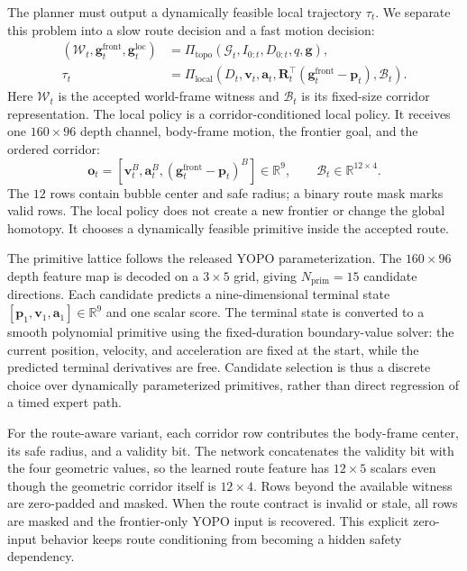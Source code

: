 \documentclass[letterpaper,10pt,conference]{ieeeconf}
\newcommand{\vect}[1]{\boldsymbol{#1}}
\newcommand{\R}{\mathbb{R}}
\begin{document}
The planner must output a dynamically feasible local trajectory $\tau_t$.
We separate this problem into a slow route decision and a fast motion
decision:
\begin{align}
  (\mathcal{W}_t,\vect{g}^{\mathrm{front}}_t,
   \vect{g}^{\mathrm{loc}}_t)
    &= \Pi_{\mathrm{topo}}(\mathcal{G}_t,I_{0:t},D_{0:t},q,\vect{g}), \\
  \tau_t
    &= \Pi_{\mathrm{local}}(D_t,\vect{v}_t,\vect{a}_t,
       \vect{R}_t^\top(\vect{g}^{\mathrm{front}}_t-\vect{p}_t),
       \mathcal{B}_t).
\end{align}
Here $\mathcal{W}_t$ is the accepted world-frame witness and
$\mathcal{B}_t$ is its fixed-size corridor representation.  The local policy
is a corridor-conditioned local policy.  It receives one $160\times96$ depth channel,
body-frame motion, the frontier goal, and the ordered corridor:
\begin{equation}
 \vect{o}_t = [\vect{v}^{B}_t,\vect{a}^{B}_t,
                (\vect{g}^{\mathrm{front}}_t-\vect{p}_t)^{B}] \in \R^9,
 \qquad
 \mathcal{B}_t\in\R^{12\times4}.
\end{equation}
The $12$ rows contain bubble center and safe radius; a binary route mask marks
valid rows.  The local policy does not create a new frontier or change the global
homotopy.  It chooses a dynamically feasible primitive inside the accepted
route.

The primitive lattice follows the released YOPO parameterization.  The
$160\times96$ depth feature map is decoded on a $3\times5$ grid, giving
$N_{\mathrm{prim}}=15$ candidate directions.  Each candidate predicts a
nine-dimensional terminal state $[\vect{p}_1,\vect{v}_1,\vect{a}_1]\in\R^9$
and one scalar score.  The terminal state is converted to a smooth
polynomial primitive using the fixed-duration boundary-value solver: the
current position, velocity, and acceleration are fixed at the start, while
the predicted terminal derivatives are free.  Candidate selection is thus a
discrete choice over dynamically parameterized primitives, rather than direct
regression of a timed expert path.

For the route-aware variant, each corridor row contributes the body-frame
center, its safe radius, and a validity bit.  The network concatenates the
validity bit with the four geometric values, so the learned route feature has
$12\times5$ scalars even though the geometric corridor itself is
$12\times4$.  Rows beyond the available witness are zero-padded and masked.
When the route contract is invalid or stale, all rows are masked and the
frontier-only YOPO input is recovered.  This explicit zero-input behavior
keeps route conditioning from becoming a hidden safety dependency.
\end{document}

